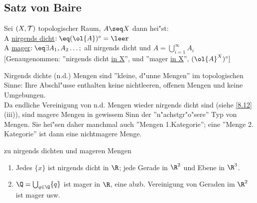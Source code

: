 \subsection{Satz von {\sc Baire}}
\begin{definition}\label{8.10}
Sei $(X,\mathcal T)$ topologischer Raum, $A\seq X$ dann hei"st:\\
A \ul{nirgends dicht}$:\eq \inn{(\ol{A} )}=\leer$\\
A \ul{mager}$:\eq \exists A_1, A_2\dots ;$ all nirgends dicht und $A=\bigcup_{i=1}^\infty A_i$\\
$[$Genaugenommen: ''nirgends dicht \ul{in X}'', und ''mager \ul{in X}'', $\inn{(\ol{A}^X)}]$
\end{definition}
Nirgends dichte (n.d.) Mengen sind ''kleine, d"unne Mengen'' im topologischen Sinne: Ihre Abschl"usse enthalten keine nichtleeren, offenen Mengen und keine Umgebungen.\\
Da endliche Vereinigung von n.d. Mengen wieder nirgends dicht sind (siehe \ref{8.12}(iii)), sind magere Mengen in gewissem Sinn der ''n"achstgr"o"sere'' Typ von Mengen. Sie hei"sen daher manchmal auch ''Mengen 1.Kategorie''; eine ''Menge 2. Kategorie'' ist dann eine nichtmagere Menge.
\begin{beispiel}\label{8.11} zu nirgends dichten und mageren Mengen
\begin{enumerate}
\item Jedes $\{ x\}$ ist nirgends dicht in $\R$; jede Gerade in $\R^2$ und Ebene in $\R^3$.
\item $\Q =\bigcup_{q\in\Q}\{ q\}$ ist mager in $\R$, eine abzb. Vereinigung von Geraden im $\R^2$ ist mager usw.
\end{enumerate}
\end{beispiel}

